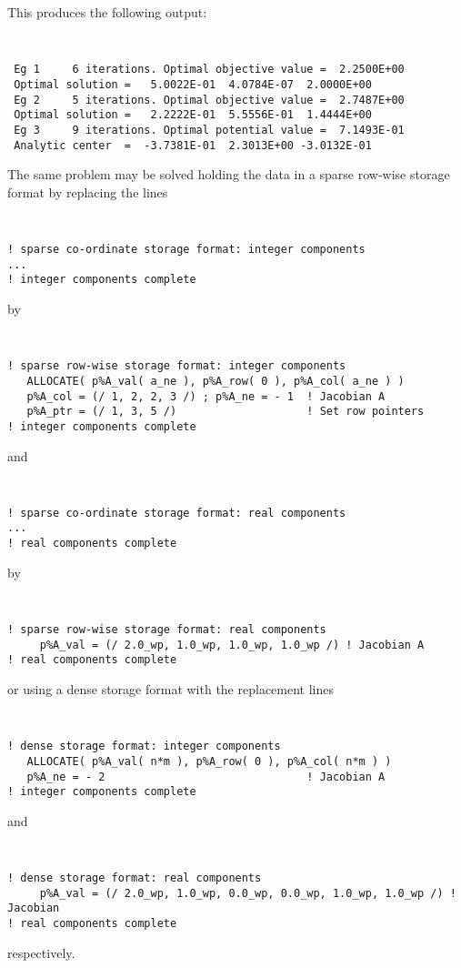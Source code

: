 \documentclass{galahad}
\begin{document}
\noindent
This produces the following output:
{\tt \small
\begin{verbatim}
 Eg 1     6 iterations. Optimal objective value =  2.2500E+00
 Optimal solution =   5.0022E-01  4.0784E-07  2.0000E+00
 Eg 2     5 iterations. Optimal objective value =  2.7487E+00
 Optimal solution =   2.2222E-01  5.5556E-01  1.4444E+00
 Eg 3     9 iterations. Optimal potential value =  7.1493E-01
 Analytic center  =  -3.7381E-01  2.3013E+00 -3.0132E-01
\end{verbatim}
}
\noindent
The same problem may be solved holding the data in
a sparse row-wise storage format by replacing the lines
{\tt \small
\begin{verbatim}
! sparse co-ordinate storage format: integer components
...
! integer components complete
\end{verbatim}
}
\noindent
by
{\tt \small
\begin{verbatim}
! sparse row-wise storage format: integer components
   ALLOCATE( p%A_val( a_ne ), p%A_row( 0 ), p%A_col( a_ne ) )
   p%A_col = (/ 1, 2, 2, 3 /) ; p%A_ne = - 1  ! Jacobian A
   p%A_ptr = (/ 1, 3, 5 /)                    ! Set row pointers
! integer components complete
\end{verbatim}
}
\noindent
and
{\tt \small
\begin{verbatim}
! sparse co-ordinate storage format: real components
...
! real components complete
\end{verbatim}
}
\noindent
by
{\tt \small
\begin{verbatim}
! sparse row-wise storage format: real components
     p%A_val = (/ 2.0_wp, 1.0_wp, 1.0_wp, 1.0_wp /) ! Jacobian A
! real components complete
\end{verbatim}
}
\noindent
or using a dense storage format with the replacement lines
{\tt \small
\begin{verbatim}
! dense storage format: integer components
   ALLOCATE( p%A_val( n*m ), p%A_row( 0 ), p%A_col( n*m ) )
   p%A_ne = - 2                               ! Jacobian A
! integer components complete
\end{verbatim}
}
\noindent
and
{\tt \small
\begin{verbatim}
! dense storage format: real components
     p%A_val = (/ 2.0_wp, 1.0_wp, 0.0_wp, 0.0_wp, 1.0_wp, 1.0_wp /) ! Jacobian
! real components complete
\end{verbatim}
}
\noindent
respectively.
\end{document}
